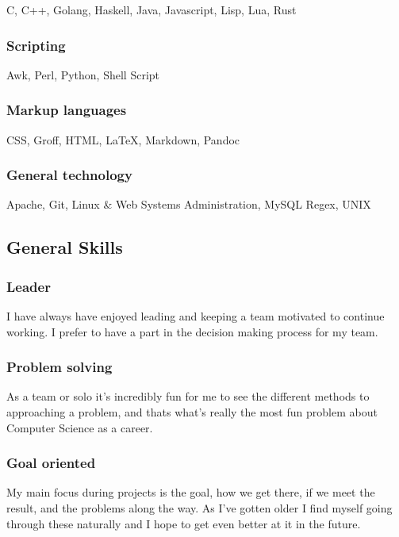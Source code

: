 \documentclass{article}
\begin{document}
C, C++, Golang, Haskell, Java, Javascript, Lisp, Lua, Rust

\subsubsection{Scripting}

Awk, Perl, Python, Shell Script

\subsubsection{Markup languages}

CSS, Groff, HTML, {\LaTeX}, Markdown, Pandoc

\subsubsection{General technology}

Apache, Git, Linux \& Web Systems Administration, MySQL Regex, UNIX

\subsection{General Skills}

\subsubsection{Leader}

I have always have enjoyed leading and keeping a team motivated to continue working. I prefer to have a part in the decision making process for my team.

\subsubsection{Problem solving}

As a team or solo it's incredibly fun for me to see the different methods to approaching a problem, and thats what's really the most fun problem about Computer Science as a career.

\subsubsection{Goal oriented}

My main focus during projects is the goal, how we get there, if we meet the result, and the problems along the way. As I've gotten older I find myself going through these naturally and I hope to get even better at it in the future.
\end{document}

